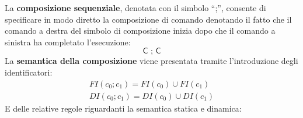\documentclass[a4paper]{article}
\newcommand{\dquotes}[1]{``#1''}
\begin{document}
 	La \textcolor{Red3}{\textbf{composizione sequenziale}}, denotata con il simbolo \dquotes{;}, consente di specificare in modo diretto la composizione di comando denotando il fatto che il comando a destra del simbolo di composizione inizia dopo che il comando a sinistra ha completato l'esecuzione:
 	\begin{equation*}
 		\textsf{C ; C}
 	\end{equation*}
 	La \textbf{semantica della composizione} viene presentata tramite l'introduzione degli identificatori:
 	\begin{gather*}
 		FI\left(c_{0} ; c_{1}\right) = FI\left(c_{0}\right) \cup FI\left(c_{1}\right) \\
 		DI\left(c_{0} ; c_{1}\right) = DI\left(c_{0}\right) \cup DI\left(c_{1}\right)
 	\end{gather*}
 	E delle relative regole riguardanti la semantica statica e dinamica:
\end{document}
